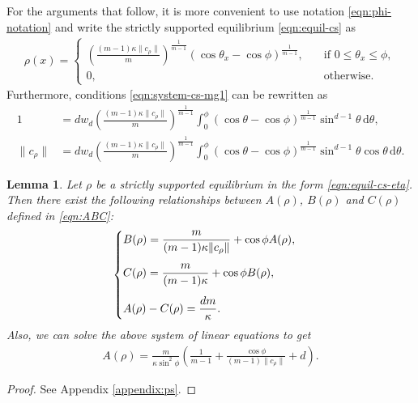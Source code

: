 \documentclass[11pt]{amsart}
\newtheorem{lemma}{Lemma}[section]
\def\d{\mathrm{d}}
\newcommand{\dm}{d} %
\begin{document}
For the arguments that follow, it is more convenient to use notation \eqref{eqn:phi-notation} and write the strictly supported equilibrium \eqref{eqn:equil-cs}  as
\begin{align}
\label{eqn:equil-cs-eta}
\rho(x)=\begin{cases}
\displaystyle\left(\frac{(m-1)\kappa\|c_\rho\|}{m}\right)^{\frac{1}{m-1}}(\cos\theta_x-\cos\phi)^{\frac{1}{m-1}},&\quad\text {if }0\leq \theta_x\leq\phi,\\
0,&\quad \text{otherwise}.
\end{cases}
\end{align}
Furthermore, conditions \eqref{eqn:system-cs-mg1} can be rewritten as
\begin{subequations}
\label{eqn:equil-cs-1s}
\begin{align}
1&=\dm w_\dm \left(\frac{(m-1)\kappa \|c_\rho\|}{m}\right)^{\frac{1}{m-1}}\int_0^\phi\left(\cos\theta-\cos\phi\right)^{\frac{1}{m-1}}\sin^{\dm-1}\theta \, \d\theta, \label{eqn:equil-cs-1}\\
\|c_\rho\|& =\dm w_\dm \left(\frac{(m-1)\kappa \|c_\rho\|}{m}\right)^{\frac{1}{m-1}}\int_0^\phi\left(\cos\theta-\cos\phi\right)^{\frac{1}{m-1}}\sin^{\dm-1}\theta \cos\theta \, \d\theta.\label{eqn:equil-cs-s}
\end{align}
\end{subequations}

\begin{lemma}
\label{lemma:ABC-cs}
Let $\rho$ be a strictly supported equilibrium in the form \eqref{eqn:equil-cs-eta}. Then there exist the following relationships between $A(\rho)$, $B(\rho)$ and $C(\rho)$ defined in \eqref{eqn:ABC}:
\begin{align}
\label{ABC-system}
\begin{cases}
\displaystyle B(\rho)=\frac{m}{(m-1)\kappa\|c_\rho\|}+\cos\phi A(\rho),\vspace{0.3cm}\\
\displaystyle C(\rho)=\frac{m}{(m-1)\kappa}+\cos\phi B(\rho),\vspace{0.3cm}\\
\displaystyle A(\rho)-C(\rho)=\frac{\dm m}{\kappa}.
\end{cases}
\end{align}
Also, we can solve the above system of linear equations to get
\begin{align}\label{eqn:cs-A}
A(\rho)=\frac{m}{\kappa\sin^2\phi}\left(\frac{1}{m-1}+\frac{\cos\phi}{(m-1)\|c_\rho\|}+\dm\right).
\end{align}
\end{lemma}
\begin{proof}
See Appendix \ref{appendix:ps}.
\end{proof}
\end{document}
